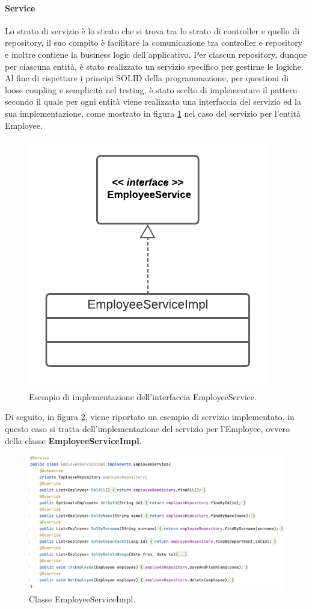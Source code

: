 \paragraph{Service}
Lo strato di servizio è lo strato che si trova tra lo strato di controller e quello di repository, il suo compito è facilitare la comunicazione tra controller e repository e inoltre contiene la business logic dell'applicativo.
Per ciascun repository, dunque per ciascuna entità, è stato realizzato un servizio specifico per gestirne le logiche.\\
Al fine di rispettare i principi SOLID della programmazione, per questioni di loose coupling e semplicità nel testing, è stato scelto di implementare il pattern secondo il quale per ogni entità viene realizzata una interfaccia del servizio ed la sua implementazione, come mostrato in figura \ref{service-serviceImpl} nel caso del servizio per l'entità Employee.
\FloatBarrier
\begin{figure}[!ht]
\centering
\includegraphics[width=0.3\linewidth]{immagini/service_serviceImpl.pdf}
\caption{Esempio di implementazione dell'interfaccia EmployeeService.}
\label{service-serviceImpl}
\end{figure}
\FloatBarrier
Di seguito, in figura \ref{employeeServiceImpl}, viene riportato un esempio di servizio implementato, in questo caso si tratta dell'implementazione del servizio per l'Employee, ovvero della classe \textbf{EmployeeServiceImpl}.
\FloatBarrier
\begin{figure}[!ht]
\begin{mdframed}
\centering
\includegraphics[width=1\linewidth]{immagini/employeeServiceImpl.png}
\end{mdframed}
\caption{Classe EmployeeServiceImpl.}
\label{employeeServiceImpl}
\end{figure}
